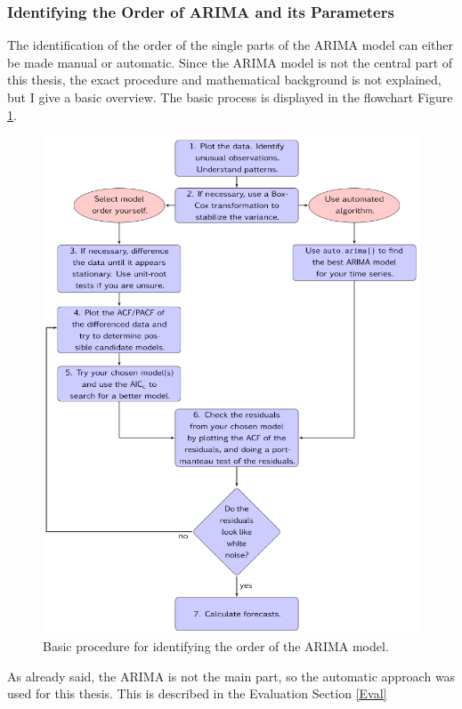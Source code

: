 \subsubsection{Identifying the Order of ARIMA and its Parameters}
The identification of the order of the single parts of the ARIMA model can either be made manual or automatic.
Since the ARIMA model is not the central part of this thesis, the exact procedure and mathematical background is not explained, but I give a basic overview.
The basic process is displayed in the flowchart Figure \ref{fig:arimaflowchart}.
\begin{figure}
	\centering
	\includegraphics[width=1\linewidth]{Pictures/arimaflowchart}
	\caption{Basic procedure for identifying the order of the ARIMA model.\cite{forecasting}}
	\label{fig:arimaflowchart}
\end{figure}
As already said, the ARIMA is not the main part, so the automatic approach was used for this thesis.
This is described in the Evaluation Section \ref{Eval}   

